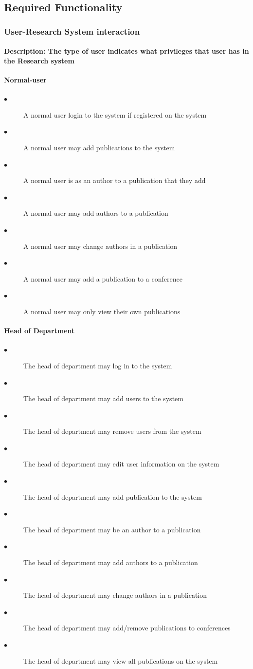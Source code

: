 \documentclass[a4paper]{article}
\begin{document}
	\subsection{Required Functionality}
	\subsubsection{User-Research System interaction}
	\paragraph{\textbf{Description:} The type of user indicates what privileges that user has in the Research system}
	\paragraph{\textbf{Normal-user}}
	\begin{description}
		\item[$\bullet$] A normal user login to the system if registered on the system
		\item[$\bullet$] A normal user may add publications to the system
		\item[$\bullet$] A normal user is as an author to a publication that they add
		\item[$\bullet$] A normal user may add authors to a publication
		\item[$\bullet$] A normal user may change authors in a publication
		\item[$\bullet$] A normal user may add a publication to a conference
		\item[$\bullet$] A normal user may only view their own publications
	\end{description}
	\paragraph{\textbf{Head of Department}}
	\begin{description}
		\item[$\bullet$] The head of department may log in to the system
		\item[$\bullet$] The head of department may add users to the system
		\item[$\bullet$] The head of department may remove users from the system
		\item[$\bullet$] The head of department may edit user information on the system
		\item[$\bullet$] The head of department may add publication to the system
		\item[$\bullet$] The head of department may be an author to a publication
		\item[$\bullet$] The head of department may add authors to a publication
		\item[$\bullet$] The head of department may change authors in a publication
		\item[$\bullet$] The head of department may add/remove publications to conferences
		\item[$\bullet$] The head of department may view all publications on the system
	\end{description}
\end{document}
